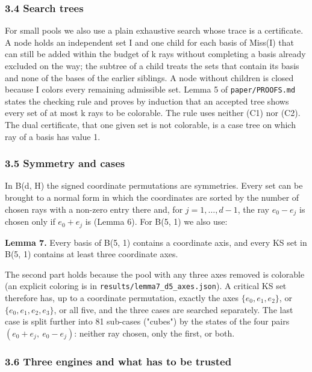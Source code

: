 \documentclass[11pt,a4paper]{article}
\begin{document}
\subsubsection{3.4 Search trees}\label{34-search-trees}

For small pools we also use a plain exhaustive search whose trace is a certificate. A node holds an
independent set I and one child for each basis of Miss(I) that can still be added within the budget of
k rays without completing a basis already excluded on the way; the subtree of a child treats the sets
that contain its basis and none of the bases of the earlier siblings. A node without children is closed
because I colors every remaining admissible set. Lemma 5 of \texttt{paper/PROOFS.md} states the checking rule
and proves by induction that an accepted tree shows every set of at most k rays to be colorable. The
rule uses neither (C1) nor (C2). The dual certificate, that one given set is not colorable, is a case
tree on which ray of a basis has value 1.

\subsubsection{3.5 Symmetry and cases}\label{35-symmetry-and-cases}

In B(d, H) the signed coordinate permutations are symmetries. Every set can be brought to a normal form
in which the coordinates are sorted by the number of chosen rays with a non-zero entry there and, for
\(j = 1, \dots, d-1\), the ray \(e_0 - e_j\) is chosen only if \(e_0 + e_j\) is (Lemma 6). For B(5, 1) we also use:

\textbf{Lemma 7.} Every basis of B(5, 1) contains a coordinate axis, and every KS set in B(5, 1) contains at
least three coordinate axes.

The second part holds because the pool with any three axes removed is colorable (an explicit coloring
is in \texttt{results/lemma7\_d5\_axes.json}). A critical KS set therefore has, up to a coordinate permutation,
exactly the axes \(\{e_0, e_1, e_2\}\), or \(\{e_0, e_1, e_2, e_3\}\), or all five, and the three cases are searched
separately. The last case is split further into 81 sub-cases ("cubes") by the states of the four pairs
\((e_0 + e_j,\ e_0 - e_j)\): neither ray chosen, only the first, or both.

\subsubsection{3.6 Three engines and what has to be trusted}\label{36-three-engines-and-what-has-to-be-trusted}
\end{document}
